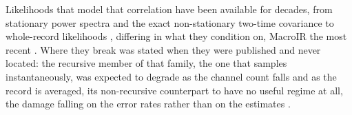Likelihoods that model that correlation have been available for decades, from stationary power
spectra and the exact non-stationary two-time covariance
\citep{katz1970membrane,katz1972statistical,anderson1973voltage,conti1980conductance,sigworth1981covariance}
to whole-record likelihoods
\citep{celentano2004use,milescu2005maximum,moffatt2007estimation,stepanyuk2011efficient,munch2022bayesian},
differing in what they condition on, MacroIR the most recent \citep{moffatt2025bayesian}.
Where they break was stated when they were published and never located: the recursive member of that family, the one that samples instantaneously, was expected to degrade as the channel count falls and as the record is averaged,
its non-recursive counterpart to have no useful regime at all, the damage falling on the error rates
rather than on the estimates \citep{moffatt2007estimation}.

